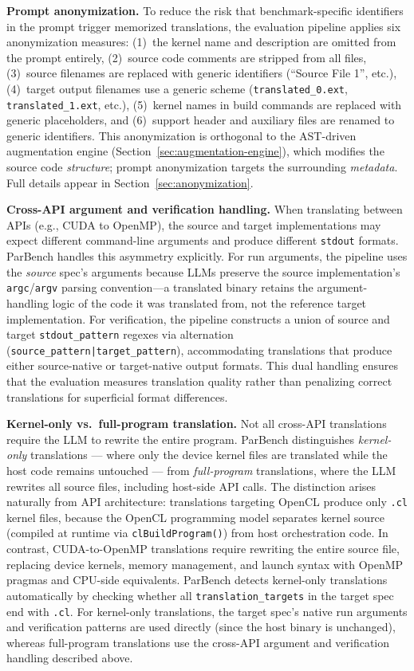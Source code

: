 \documentclass[conference]{IEEEtran}
\begin{document}
\textbf{Prompt anonymization.} To reduce the risk that benchmark-specific identifiers in the prompt trigger memorized translations, the evaluation pipeline applies six anonymization measures: (1)~the kernel name and description are omitted from the prompt entirely, (2)~source code comments are stripped from all files, (3)~source filenames are replaced with generic identifiers (``Source File 1'', etc.), (4)~target output filenames use a generic scheme (\texttt{translated\_0.ext}, \texttt{translated\_1.ext}, etc.), (5)~kernel names in build commands are replaced with generic placeholders, and (6)~support header and auxiliary files are renamed to generic identifiers. This anonymization is orthogonal to the AST-driven augmentation engine (Section~\ref{sec:augmentation-engine}), which modifies the source code \emph{structure}; prompt anonymization targets the surrounding \emph{metadata}. Full details appear in Section~\ref{sec:anonymization}.

\textbf{Cross-API argument and verification handling.} When translating between APIs (e.g., CUDA to OpenMP), the source and target implementations may expect different command-line arguments and produce different \texttt{stdout} formats. ParBench handles this asymmetry explicitly. For run arguments, the pipeline uses the \emph{source} spec's arguments because LLMs preserve the source implementation's \texttt{argc}/\texttt{argv} parsing convention---a translated binary retains the argument-handling logic of the code it was translated from, not the reference target implementation. For verification, the pipeline constructs a union of source and target \texttt{stdout\_pattern} regexes via alternation (\texttt{source\_pattern|target\_pattern}), accommodating translations that produce either source-native or target-native output formats. This dual handling ensures that the evaluation measures translation quality rather than penalizing correct translations for superficial format differences.

\textbf{Kernel-only vs.\ full-program translation.} Not all cross-API translations require the LLM to rewrite the entire program. ParBench distinguishes \emph{kernel-only} translations --- where only the device kernel files are translated while the host code remains untouched --- from \emph{full-program} translations, where the LLM rewrites all source files, including host-side API calls. The distinction arises naturally from API architecture: translations targeting OpenCL produce only \texttt{.cl} kernel files, because the OpenCL programming model separates kernel source (compiled at runtime via \texttt{clBuildProgram()}) from host orchestration code. In contrast, CUDA-to-OpenMP translations require rewriting the entire source file, replacing device kernels, memory management, and launch syntax with OpenMP pragmas and CPU-side equivalents. ParBench detects kernel-only translations automatically by checking whether all \texttt{translation\_targets} in the target spec end with \texttt{.cl}. For kernel-only translations, the target spec's native run arguments and verification patterns are used directly (since the host binary is unchanged), whereas full-program translations use the cross-API argument and verification handling described above.
\end{document}
